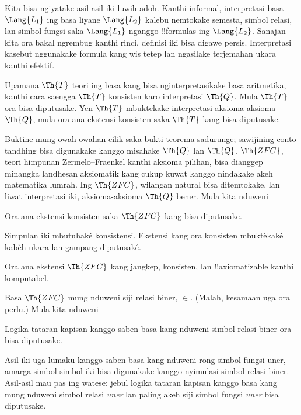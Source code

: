 \documentclass[../../../include/open-logic-section]{subfiles}
\begin{document}


Kita bisa ngiyatake asil-asil iki luwih adoh. Kanthi informal,
interpretasi basa $\Lang{L_1}$ ing basa liyane
$\Lang{L_2}$ kalebu nemtokake semesta, simbol relasi, lan
simbol fungsi saka $\Lang{L_1}$ nganggo !!{formula}s ing
$\Lang{L_2}$. Sanajan kita ora bakal ngrembug kanthi rinci, definisi
iki bisa digawe persis. Interpretasi kasebut nggunakake formula kang wis tetep lan ngasilake terjemahan ukara kanthi efektif.

\begin{thm}
  Upamana $\Th{T}$ teori ing basa kang bisa nginterpretasikake basa
  aritmetika, kanthi cara saengga $\Th{T}$ konsisten karo interpretasi
  $\Th{Q}$. Mula $\Th{T}$ ora bisa diputusake. Yen $\Th{T}$
  mbuktekake interpretasi aksioma-aksioma $\Th{Q}$, mula ora ana
  ekstensi konsisten saka $\Th{T}$ kang bisa diputusake.
\end{thm}

Buktine mung owah-owahan cilik saka bukti teorema sadurunge;
sawijining conto tandhing bisa digunakake kanggo misahake $\Th{Q}$ lan
$\Th{\bar Q}$. $\Th{ZFC}$, teori himpunan Zermelo--Fraenkel kanthi
aksioma pilihan, bisa dianggep minangka landhesan aksiomatik kang cukup
kuwat kanggo nindakake akeh matematika lumrah. Ing $\Th{ZFC}$,
wilangan natural bisa ditemtokake, lan liwat interpretasi iki,
aksioma-aksioma $\Th{Q}$ bener. Mula kita nduweni

\begin{cor}
Ora ana ekstensi konsisten saka $\Th{ZFC}$ kang bisa diputusake.
\end{cor}
Simpulan iki mbutuhaké konsistensi. Ekstensi kang ora konsisten mbuktèkaké kabèh ukara lan gampang diputusaké.

\begin{cor}
Ora ana ekstensi $\Th{ZFC}$ kang jangkep, konsisten, lan
!!{axiomatizable} kanthi komputabel.
\end{cor}

Basa $\Th{ZFC}$ mung nduweni siji relasi biner,
$\in$. (Malah, kesamaan uga ora perlu.) Mula kita nduweni

\begin{cor}
Logika tataran kapisan kanggo saben basa kang nduweni simbol relasi biner
ora bisa diputusake.
\end{cor}

Asil iki uga lumaku kanggo saben basa kang nduweni rong simbol fungsi
uner, amarga simbol-simbol iki bisa digunakake kanggo nyimulasi simbol
relasi biner. Asil-asil mau pas ing watese: jebul logika tataran kapisan kanggo
basa kang mung nduweni simbol relasi \emph{uner} lan paling akeh siji
simbol fungsi \emph{uner} bisa diputusake.
\end{document}
